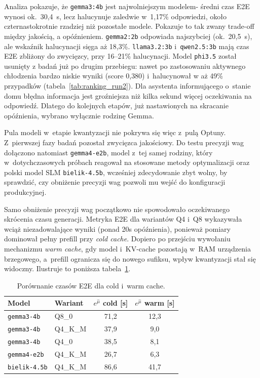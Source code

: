 Analiza pokazuje, że \texttt{gemma3:4b} jest najwolniejszym modelem- średni czas
E2E wynosi ok.~30{,}4~s, lecz halucynuje zaledwie w~1{,}17\% odpowiedzi,
około czternastokrotnie rzadziej niż pozostałe modele. Pokazuje to tak zwany trade-off między jakością, a opóźnieniem. \texttt{gemma2:2b}
odpowiada najszybciej (ok.~20{,}5~s), ale wskaźnik halucynacji sięga aż 18{,}3\%.
\texttt{llama3.2:3b} i~\texttt{qwen2.5:3b} mają czas E2E zbliżony do zwycięzcy,
przy 16--21\% halucynacji. Model \texttt{phi3.5} został usunięty z badań już po drugim
przebiegu: nawet po zastosowaniu aktywnego chłodzenia bardzo niskie wyniki (score 0{,}380) i~halucynował
w aż 49\% przypadków (tabela~\ref{tab:ranking_run2}). Dla asystenta informującego
o~stanie domu błędna informacja jest groźniejsza niż kilka sekund więcej oczekiwania na odpowiedź. Dlatego do kolejnych etapów, już nastawionych na skracanie
opóźnienia, wybrano wyłącznie rodzinę Gemma.

Pula modeli w~etapie kwantyzacji nie pokrywa się więc z~pulą Optuny.
Z~pierwszej fazy badań pozostał zwycięzca jakościowy. Do testu precyzji wag
dołączono natomiast \texttt{gemma4-e2b}, model z~tej samej rodziny, który
w~dotychczasowych próbach reagował na stosowane metody optymalizacji
oraz polski model SLM \texttt{bielik-4.5b}, wcześniej zdecydowanie zbyt wolny, by
sprawdzić, czy obniżenie precyzji wag pozwoli mu wejść do konfiguracji
produkcyjnej.

Samo obniżenie precyzji wag początkowo nie spowodowało oczekiwanego
skrócenia czasu generacji. Metryka E2E dla wariantów Q4 i~Q8 wykazywała wciąż niezadowalające wyniki (ponad 20s opóźnienia), ponieważ
pomiary dominował pełny prefill przy \emph{cold cache}. Dopiero po przejściu wywołaniu mechanizmu \emph{warm cache}, gdy model i~KV-cache pozostają w~RAM urządzenia brzegowego,
a~prefill ogranicza się do nowego sufiksu, wpływ kwantyzacji stał się
widoczny. Ilustruje to poniższa tabela~\ref{tab:podsumowanie_kwantyzacja}.

\begin{table}[H]
  \centering
  \caption{Porównanie czasów E2E dla cold i~warm cache.}
  \label{tab:podsumowanie_kwantyzacja}
  \small
  \begin{tabular}{llcc}
    \hline
    Model & Wariant & $e^{\hat\mu}$ cold [s] & $e^{\hat\mu}$ warm [s] \\
    \hline
    \texttt{gemma3-4b}  & Q8\_0    & 71{,}2 & 12{,}3 \\
    \texttt{gemma3-4b}  & Q4\_K\_M & 37{,}9 & 9{,}0 \\
    \texttt{gemma3-4b}  & Q4\_0    & 38{,}5 & 8{,}1 \\
    \texttt{gemma4-e2b} & Q4\_K\_M & 26{,}7 & 6{,}3 \\
    \texttt{bielik-4.5b}& Q4\_K\_M & 86{,}6 & 41{,}7 \\
    \hline
  \end{tabular}
\end{table}

